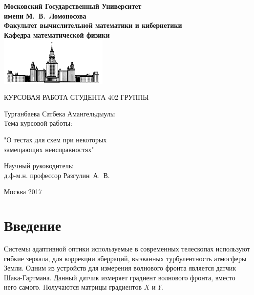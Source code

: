 \documentclass[oneside, final, 14pt]{extreport}
\begin{document}
\sloppy
	\renewcommand\contentsname{Содержание} %

\begin{titlepage}
\begin{center}
\bfseries
Московский Государственный Университет \\имени М.~В.~Ломоносова\\
Факультет вычислительной математики и кибернетики\\
Кафедра математической физики\\
\includegraphics[width=0.4\textwidth]{msu_logo_small.png}\\
\vfill	

\mdseries
\begin{Large}
КУРСОВАЯ РАБОТА СТУДЕНТА 402 ГРУППЫ\\
\end{Large}
Турганбаева Сатбека Амангельдыулы\\
\vfill	
Тема курсовой работы:\\
\vspace{1cm}
\bfseries
\begin{Large}
"О тестах для схем при некоторых \\	замещающих неисправностях"\\
\end{Large}
\vfill	

  \begin{flushright}
        Научный руководитель:\\
        д.ф-м.н. профессор Разгулин~А.~В.
    \end{flushright}

\vfill	


\end{center}

\begin{center}
	Москва 2017
\end{center}

\end{titlepage}

\tableofcontents

\newpage
\section*{Введение}
Системы адаптивной оптики используемые в современных телескопах используют гибкие зеркала, для коррекции аберраций, вызванных турбулентность атмосферы Земли. Одним из устройств для измерения волнового фронта является датчик Шака-Гартмана. Данный датчик измеряет градиент волнового фронта, вместо него самого. Получаются матрицы градиентов $X$ и $Y$.
\end{document}
